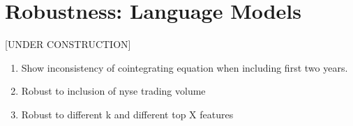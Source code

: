 \chapter{Robustness: Language Models\label{apndxA}}

[UNDER CONSTRUCTION]

\begin{enumerate}
  \item Show inconsistency of cointegrating equation when including first two years.
  \item Robust to inclusion of nyse trading volume
  \item Robust to different k and different top X features
\end{enumerate}


